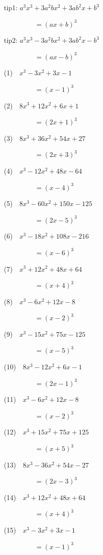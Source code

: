 \documentclass[a4j,twocolumn,10pt,fleqn]{jarticle}
\begin{document}
tip1: $a^{3} x^{3} + 3 a^{2} b x^{2} + 3 a b^{2} x + b^{3}$

~~~~~~~~~$=\left(a x + b\right)^{3}$


tip2: $a^{3} x^{3} - 3 a^{2} b x^{2} + 3 a b^{2} x - b^{3}$

~~~~~~~~~$=\left(a x - b\right)^{3}$


(1)~~$x^{3} - 3 x^{2} + 3 x - 1$

~~~~~~~~~$=\left(x - 1\right)^{3}$

(2)~~$8 x^{3} + 12 x^{2} + 6 x + 1$

~~~~~~~~~$=\left(2 x + 1\right)^{3}$

(3)~~$8 x^{3} + 36 x^{2} + 54 x + 27$

~~~~~~~~~$=\left(2 x + 3\right)^{3}$

(4)~~$x^{3} - 12 x^{2} + 48 x - 64$

~~~~~~~~~$=\left(x - 4\right)^{3}$

(5)~~$8 x^{3} - 60 x^{2} + 150 x - 125$

~~~~~~~~~$=\left(2 x - 5\right)^{3}$

(6)~~$x^{3} - 18 x^{2} + 108 x - 216$

~~~~~~~~~$=\left(x - 6\right)^{3}$

(7)~~$x^{3} + 12 x^{2} + 48 x + 64$

~~~~~~~~~$=\left(x + 4\right)^{3}$

(8)~~$x^{3} - 6 x^{2} + 12 x - 8$

~~~~~~~~~$=\left(x - 2\right)^{3}$

(9)~~$x^{3} - 15 x^{2} + 75 x - 125$

~~~~~~~~~$=\left(x - 5\right)^{3}$

(10)~~$8 x^{3} - 12 x^{2} + 6 x - 1$

~~~~~~~~~$=\left(2 x - 1\right)^{3}$

(11)~~$x^{3} - 6 x^{2} + 12 x - 8$

~~~~~~~~~$=\left(x - 2\right)^{3}$

(12)~~$x^{3} + 15 x^{2} + 75 x + 125$

~~~~~~~~~$=\left(x + 5\right)^{3}$

(13)~~$8 x^{3} - 36 x^{2} + 54 x - 27$

~~~~~~~~~$=\left(2 x - 3\right)^{3}$

(14)~~$x^{3} + 12 x^{2} + 48 x + 64$

~~~~~~~~~$=\left(x + 4\right)^{3}$

(15)~~$x^{3} - 3 x^{2} + 3 x - 1$

~~~~~~~~~$=\left(x - 1\right)^{3}$
\end{document}
